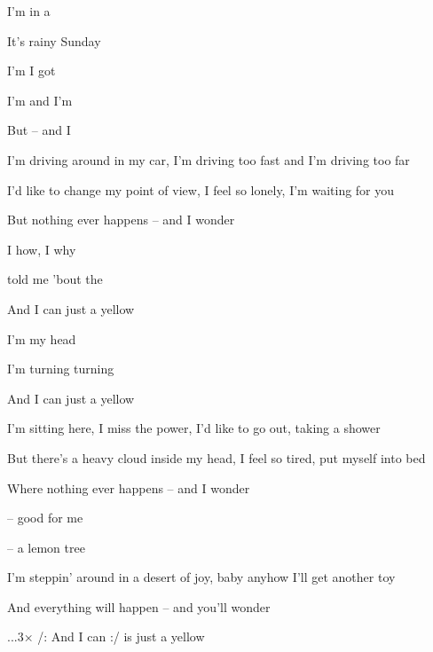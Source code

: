 

\zs
I'm  in a 

It's  rainy Sunday 

I'm  I got 

I'm  and I'm 

But  --  and I   
\ks

\zs
I'm driving around in my car, I'm driving too fast and I'm driving too far

I'd like to change my point of view, I feel so lonely, I'm waiting for you

But nothing ever happens -- and I wonder
\ks

\zr
I  how, I  why

 told me 'bout the 

And  I can  just a yellow  

I'm  my head 

I'm  turning turning 

And  I can  just a yellow 
\kr

\zs
{}    
   
\ks

\zs
I'm sitting here, I miss the power, I'd like to go out, taking a shower

But there's a heavy cloud inside my head, I feel so tired, put myself into bed

Where nothing ever happens -- and I wonder
\ks

 --  good for me

 --    a lemon tree

\zs
I'm steppin' around in a desert of joy, baby anyhow I'll get another toy

And everything will happen -- and you'll wonder
\ks

\zr\kr

...3× /: And  I can  :/
is just a yellow 

\kp
